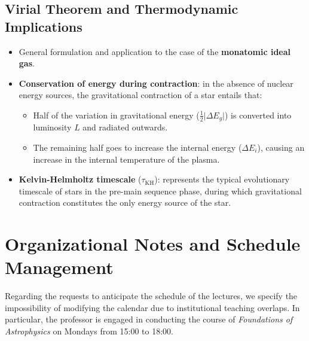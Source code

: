 \subsection{Virial Theorem and Thermodynamic Implications}
\begin{itemize}
\item General formulation and application to the case of the \textbf{monatomic ideal gas}.
\item \textbf{Conservation of energy during contraction}: in the absence of nuclear energy sources, the gravitational contraction of a star entails that:
\begin{itemize}
\item Half of the variation in gravitational energy ($\frac{1}{2} \vert{}\Delta E_g\vert{}$) is converted into luminosity $L$ and radiated outwards.
\item The remaining half goes to increase the internal energy ($\Delta E_i$), causing an increase in the internal temperature of the plasma.
\end{itemize}
\item \textbf{Kelvin-Helmholtz timescale} ($\tau_{\text{KH}}$): represents the typical evolutionary timescale of stars in the pre-main sequence phase, during which gravitational contraction constitutes the only energy source of the star.
\end{itemize}

\section{Organizational Notes and Schedule Management}

Regarding the requests to anticipate the schedule of the lectures, we specify the impossibility of modifying the calendar due to institutional teaching overlaps. In particular, the professor is engaged in conducting the course of \textit{Foundations of Astrophysics} on Mondays from 15:00 to 18:00.